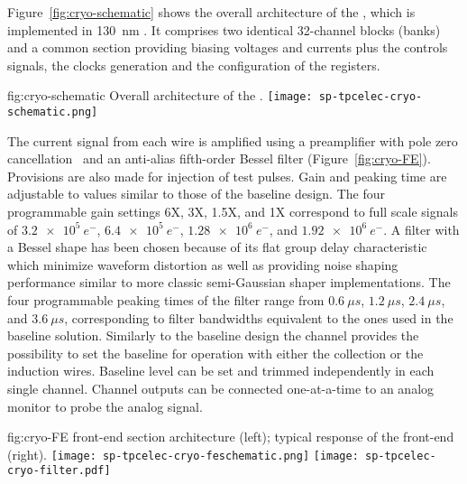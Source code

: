 Figure~\ref{fig:cryo-schematic} shows the overall architecture of the 
 , which is implemented in \SI{130}{nm} . 
It comprises two identical 32-channel blocks (banks) and a common section
providing biasing voltages and currents plus the controls signals, the clocks 
generation and the configuration of the registers.

\begin{dunefigure}
{fig:cryo-schematic}
{Overall architecture of the  .}
\texttt{[image: sp-tpcelec-cryo-schematic.png]}
\end{dunefigure}

The current signal from each wire is amplified using a preamplifier with pole 
zero cancellation~\cite{DeGeronimo:2011zz} and an anti-alias fifth-order 
Bessel filter (Figure~\ref{fig:cryo-FE}). Provisions are also made for injection 
of test pulses. Gain and peaking time are adjustable to values similar to 
those of the baseline design. 
The four programmable gain settings 6X, 3X, 1.5X, and 1X correspond to full scale signals of 
$\SI{3.2e5}{e^{-}}$, $\SI{6.4e5}{e^{-}}$, $\SI{1.28e6}{e^{-}}$, and $\SI{1.92e6}{e^{-}}$. A 
filter with a Bessel shape has been chosen because of its flat group delay characteristic 
which minimize waveform distortion as well as providing noise shaping performance similar 
to more classic semi-Gaussian shaper implementations. The four programmable peaking times 
of the filter range from $\SI{0.6}{{\mu}s}$, $\SI{1.2}{{\mu}s}$, $\SI{2.4}{{\mu}s}$, 
and $\SI{3.6}{{\mu}s}$, corresponding to filter bandwidths equivalent to the ones used in 
the baseline solution. Similarly to the baseline design the channel provides the possibility 
to set the baseline for operation with either the collection or the induction wires. 
Baseline level can be set and trimmed independently in each single channel. Channel 
outputs can be connected one-at-a-time to an analog monitor to probe the analog signal.

\begin{dunefigure}
{fig:cryo-FE}
{ front-end section architecture (left); typical response of the  front-end (right).}
\texttt{[image: sp-tpcelec-cryo-feschematic.png]}
\texttt{[image: sp-tpcelec-cryo-filter.pdf]}
\end{dunefigure}


